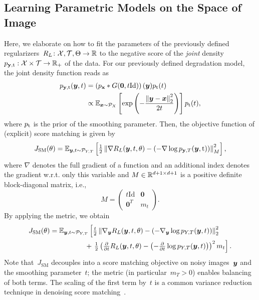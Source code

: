 \documentclass{article} %
\theoremstyle{plain}
\theoremstyle{definition}
\theoremstyle{remark}
\newcommand{\X}{\mathcal{X}}
\newcommand{\T}{\mathcal{T}}
\newcommand{\id}{\mathrm{Id}}
\newcommand{\norm}[1]{\left\Vert#1\right\Vert}
\renewcommand{\vec}[1]{\mathbf{#1}}
\newcommand{\dist}[1]{\mathcal{P}_{#1}}
\newcommand{\pdf}[1]{p_{#1}}
\begin{document}
\subsection{Learning Parametric Models on the Space of Image}
Here, we elaborate on how to fit the parameters of the previously defined regularizers~$R_L\colon\X,\T,\Theta\to\R$ to the negative score of the \emph{joint} density~$\pdf{\rvy,\rt}:\X\times\T\to\R_+$ of the data.
For our previously defined degradation model, the joint density function reads as
\begin{align*}
\pdf{\rvy,\rt}(\vy,t) &= \left(\pdf{\rvx}\ast G(\vec{0},t\id)\right)(\vy) \pdf{\rt}(t)\\
&\propto \E_{\vx\sim\dist{X}}\left[\exp\left(-\frac{\norm{\vy-\vx}_2^2}{2 t}\right)\right] \pdf{\rt}(t),
\end{align*}
where $\pdf{\rt}$ is the prior of the smoothing parameter.
Then, the objective function of (explicit) score matching is given by
\begin{align} \label{eq:jsm}
J_\mathrm{SM}(\theta) = \E_{\vy,t\sim\dist{Y,T}}\left[\tfrac12\norm{\nabla R_L(\vy,t,\theta) -\left(- \nabla\log p_{\rvy,T}(\vy,\rt)\right)}_M^2\right],
\end{align}
where $\nabla$ denotes the full gradient of a function and an additional index denotes the gradient w.r.t. only this variable and 
$M\in\mathbb{R}^{d+1\times d+1}$ is a positive definite block-diagonal matrix, i.e.,
\[
M = \begin{pmatrix}
t\id & \vec{0} \\
\vec{0}^T & m_t
\end{pmatrix}.
\]
By applying the metric, we obtain
\begin{align}
J_\mathrm{SM}(\theta) &=\E_{\vy,t\sim\dist{Y,T}}\left[\tfrac{t}{2}\norm{\nabla_\vy R_L(\vy,t,\theta) -\left(- \nabla_\vy\log p_{Y,T}(\vy,t)\right)}_2^2 \right.\label{eq:jsmParts}\\
&\hspace{5em}+ \left.\tfrac12\left(\tfrac{\partial}{\partial t}R_L(\vy,t,\theta) -\left(-\tfrac{\partial}{\partial t}\log p_{Y,T}(\vy,t)\right)\right)^2m_t\right].\notag
\end{align}
Note that~$J_\mathrm{SM}$ decouples into a score matching objective on noisy images~${\bm{y}}$ and the smoothing parameter~$t$; the metric (in particular~$m_T>0$) enables balancing of both terms.
The scaling of the first term by~$t$ is a common variance reduction technique in denoising score matching~\citep{SoEr19,HuLi21}.
\end{document}
